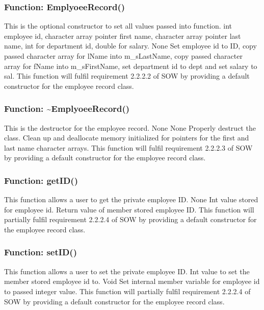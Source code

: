 \documentclass[12pt]{article}%
\newcounter{subsubsubsection}[subsubsection]
\begin{document}
\subsubsection{Function: EmplyoeeRecord()}
This is the optional constructor to set all values passed into function.
int employee id, character array pointer first name, character array pointer last name, int for
department id, double for salary.
None
Set employee id to ID, copy passed character array for lName into m\_sLastName, copy passed character array for fName into m\_sFirstName, set department id to dept and set salary to sal.
This function will fulfil requirement 2.2.2.2 of SOW by providing a default constructor for the
employee record class.

\subsubsection{Function: \textasciitilde EmplyoeeRecord()}
This is the destructor for the employee record.
None
None
Properly destruct the class. Clean up and deallocate memory initialized for pointers for the first and last name
character arrays.
This function will fulfil requirement 2.2.2.3 of SOW by providing a default constructor for the
employee record class.

\subsubsection{Function:  getID()}
This function allows a user to get the private employee ID.
None
Int value stored for employee id.
Return value of member stored employee ID.
This function will partially fulfil requirement 2.2.2.4 of SOW by providing a default constructor for the
employee record class.

\subsubsection{Function:  setID()}
This function allows a user to set the private employee ID.
Int value to set the member stored employee id to.
Void
Set internal member variable for employee id to passed integer value.
This function will partially fulfil requirement 2.2.2.4 of SOW by providing a default constructor for the
employee record class.
\end{document}

